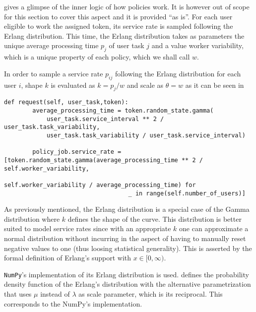 \documentclass{seal_thesis}
\begin{document}
 gives a glimpse of the inner logic of how policies work. It is however out of scope for this section to cover this aspect and it is provided ``as is''. For each user eligible to work the assigned token, its service rate is sampled following the Erlang distribution. This time, the Erlang distribution takes as parameters the unique average processing time $p_j$ of user task $j$ and a value worker variability, which is a unique property of each policy, which we shall call $w$.

In order to sample a service rate $p_{ij}$ following the Erlang distribution for each user $i$, shape $k$ is evaluated as $k=p_j/w$ and scale as $\theta = w$ as it can be seen in 



\begin{lstlisting}[caption=User service rate sampling following an Erlang distribution,label=lst:user_service_rate,style=CustomPython]
    def request(self, user_task,token):
        average_processing_time = token.random_state.gamma(
            user_task.service_interval ** 2 / user_task.task_variability,
            user_task.task_variability / user_task.service_interval)

        policy_job.service_rate = [token.random_state.gamma(average_processing_time ** 2 / self.worker_variability,
                                                           self.worker_variability / average_processing_time) for
                                   _ in range(self.number_of_users)]
\end{lstlisting}

As previously mentioned, the Erlang distribution is a special case of the Gamma distribution where $k$ defines the shape of the curve. This distribution is better suited to model service rates since with an appropriate $k$ one can approximate a normal distribution without incurring in the aspect of having to manually reset negative values to one (thus loosing statistical generality). This is asserted by the formal definition of Erlang's support with $x \in [0,\infty)$.

\texttt{NumPy}'s implementation of its Erlang distribution is used.  defines the probability density function of the Erlang's distribution with the alternative parametrization that uses $\mu$ instead of $\lambda$ as scale parameter, which is its reciprocal. This corresponds to the NumPy's implementation.
\end{document}
